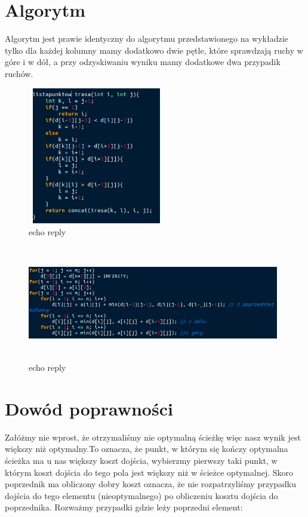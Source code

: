 \documentclass[12pt,a4paper]{article}
\begin{document}
\section{Algorytm}
Algorytm jest prawie identyczny do algorytmu przedstawionego na wykładzie tylko dla każdej kolumny mamy dodatkowo dwie pętle, które sprawdzają ruchy w góre i w dół, a przy odzyskiwaniu wyniku mamy dodatkowe dwa przypadik ruchów.
\begin{figure}[!htb]
\centering
\includegraphics[width=6cm,height=6cm]{algo.png}
\caption{echo reply}
\end{figure}
\begin{figure}[!htb]
\centering
\includegraphics[width=11cm,height=5cm]{sciezka.png}
\caption{echo reply}
\end{figure}
\section{Dowód poprawności}
Załóżmy nie wprost, że otrzymaliśmy nie optymalną ścieżkę więc nasz wynik jest większy niż optymalny.To oznacza, że punkt, w którym się kończy optymalna ścieżka ma u nas większy koszt dojścia, wybierzmy pierwszy taki punkt, w którym koszt dojścia do tego pola jest większy niż w ścieżce optymalnej. Skoro poprzednik ma obliczony dobry koszt oznacza, że nie rozpatrzyliśmy przypadku dojścia do tego elementu (nieoptymalnego) po obliczeniu kosztu dojścia do poprzednika. Rozważmy przypadki gdzie leży poprzedni element:
\end{document}
